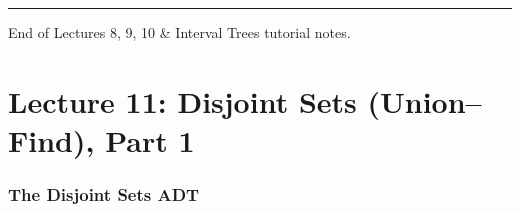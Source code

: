 \documentclass[11pt]{article}
\begin{document}
\vspace{4pt}
\begin{center}\textcolor{greyline}{\rule{0.5\linewidth}{0.6pt}}\end{center}
\begin{center}\small\textcolor{greyline}{End of Lectures 8, 9, 10 \& Interval Trees tutorial notes.}\end{center}




%
%
%
%

\newpage


\part*{\textcolor{utnavy}{Lecture 11: Disjoint Sets (Union--Find), Part 1}}
\setcounter{section}{0}

\section{The Disjoint Sets ADT}
\end{document}
